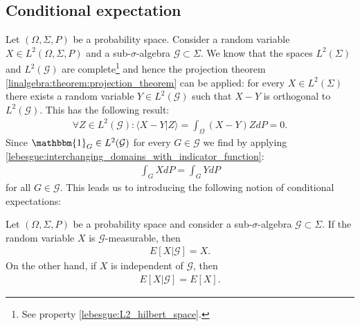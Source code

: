 \subsection{Conditional expectation}

    Let $(\Omega,\Sigma,P)$ be a probability space. Consider a random variable $X\in L^2(\Omega,\Sigma,P)$ and a sub-$\sigma$-algebra $\mathcal{G}\subset\Sigma$. We know that the spaces $L^2(\Sigma)$ and $L^2(\mathcal{G})$ are complete\footnote{See property \ref{lebesgue:L2_hilbert_space}.} and hence the projection theorem \ref{linalgebra:theorem:projection_theorem} can be applied: for every $X\in L^2(\Sigma)$ there exists a random variable $Y\in L^2(\mathcal{G})$ such that $X-Y$ is orthogonal to $L^2(\mathcal{G})$. This has the following result:
    \begin{gather}
        \forall Z\in L^2(\mathcal{G}):\langle X-Y|Z \rangle = \int_\Omega(X-Y)ZdP = 0.
    \end{gather}
    Since $\mathbbm{1}_G\in L^2(\mathcal{G})$ for every $G\in\mathcal{G}$ we find by applying \ref{lebesgue:interchanging_domains_with_indicator_function}:
    \begin{gather}
        \label{prob:conditional_expectation_condition}
        \int_G XdP = \int_G YdP
    \end{gather}
    for all $G\in\mathcal{G}$. This leads us to introducing the following notion of conditional expectations:

    \begin{property}\label{prob:conditional_expectation_props}
        Let $(\Omega, \Sigma, P)$ be a probability space and consider a sub-$\sigma$-algebra $\mathcal{G}\subset\Sigma$. If the random variable $X$ is $\mathcal{G}$-measurable, then
        \begin{gather}
            E[X|\mathcal{G}] = X.
        \end{gather}
        On the other hand, if $X$ is independent of $\mathcal{G}$, then
        \begin{gather}
            E[X|\mathcal{G}] = E[X].
        \end{gather}
    \end{property}

